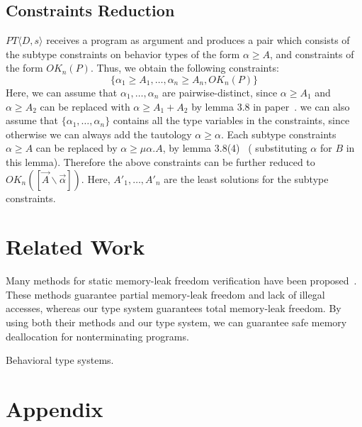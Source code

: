 \documentclass[english]{jssst_ppl} %
\theoremstyle{definition}
\begin{document}
\subsection{Constraints Reduction}
$PT\langle D, s \rangle$ receives a program as argument and produces a pair which consists of the subtype constraints on behavior types of the form $\alpha \ge A$, and constraints of the form $OK_{n}(P)$. Thus, we obtain the following constraints:\\
$$
\{ \alpha_{1} \ge A_{1}, \dots, \alpha_{n} \ge  A_{n}, OK_{n}(P)\}
$$
Here, we can assume that $\alpha_{1}, \dots, \alpha_{n}$ are pairwise-distinct, since $\alpha \ge A_{1}$ and $\alpha \ge A_{2}$ can be replaced with $\alpha \ge A_{1}+A_{2}$ by lemma 3.8 in paper~\cite{DBLP:journals/lmcs/KobayashiSW06}. we can also assume that $\{ \alpha_{1}, \dots, \alpha_{n} \}$ contains all the type variables in the constraints, since otherwise we can always add the tautology $\alpha \ge \alpha$. Each subtype constraints $\alpha \ge A$ can be replaced by $\alpha \ge \mu \alpha. A$, by lemma 3.8(4)~\cite{DBLP:journals/lmcs/KobayashiSW06} ( substituting $\alpha$ for $B$ in this lemma). Therefore the above constraints can be further reduced to $OK_{n}([\vec{A} \backslash \vec{\alpha}])$. Here, $A'_{1}, \dots, A'_{n}$ are the least solutions for the subtype constraints.




\section{Related Work}
Many methods for static memory-leak freedom verification have been
proposed~\cite{DBLP:conf/aplas/SuenagaK09,DBLP:conf/pldi/HeineL03,DBLP:conf/sigsoft/XieA05,DBLP:journals/scp/SwamyHMGJ06,DBLP:conf/sas/OrlovichR06,DBLP:conf/issta/SuiYX12}. These
methods guarantee partial memory-leak freedom and lack of illegal
accesses, whereas our type system guarantees total memory-leak
freedom. By using both their methods and our type system, we can
guarantee safe memory deallocation for nonterminating programs.

Behavioral type systems.






\newpage
\appendix
\section*{Appendix}



\end{document}
